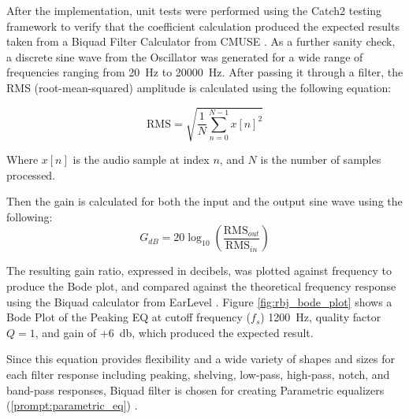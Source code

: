 After the implementation, unit tests were performed using the Catch2 testing framework \cite{catch2} to verify that the
coefficient calculation produced the expected results taken from a Biquad Filter Calculator from CMUSE \cite{cmuse2026biquad}. 
As a further sanity check, a discrete sine wave from the Oscillator was generated for a wide range of frequencies ranging from
\SI{20}{\hertz} to \SI{20000}{\hertz}. After passing it through a filter, the RMS (root-mean-squared) amplitude is calculated using the
following equation:

\begin{equation}\label{eq:rms}
    \mathrm{RMS}=\sqrt{\frac{1}{N}\sum_{n=0}^{N-1}x[n]^2}
\end{equation}

Where $x[n]$ is the audio sample at index $n$, and $N$ is the number of samples processed.

Then the gain is calculated for both the input and the output sine wave using the following:
\begin{equation}\label{eq:gain}
    G_{dB}=20\log_{10}\left(\frac{\mathrm{RMS}_{out}}{\mathrm{RMS}_{in}}\right)
\end{equation}

The resulting gain ratio, expressed in decibels, was plotted against frequency to produce the Bode plot, 
and compared against the theoretical frequency response using the Biquad calculator from 
EarLevel \cite{redmon2021biquad}. Figure \ref{fig:rbj_bode_plot} shows a Bode Plot of the Peaking EQ at cutoff frequency ($f_s$) 
\SI{1200}{\hertz}, quality factor $Q = 1$, and gain of +\SI{6}{\decibel}, which produced the expected result.



Since this equation provides flexibility and a wide variety of shapes and sizes for each filter response
including peaking, shelving, low-pass, high-pass, notch, and band-pass responses,
Biquad filter is chosen for creating Parametric equalizers (\cref{prompt:parametric_eq}) 
\cite{openai_chatgpt,vanWaterschootT.2007APPT}.